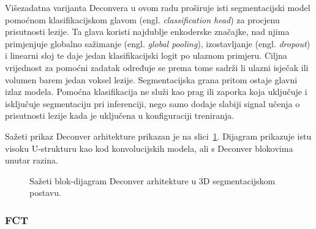 \documentclass[a4paper,12pt,oneside]{article}
\begin{document}
Višezadatna varijanta Deconvera u ovom radu proširuje isti segmentacijski model pomoćnom klasifikacijskom glavom (engl. \textit{classification head}) za procjenu prisutnosti lezije. Ta glava koristi najdublje enkoderske značajke, nad njima primjenjuje globalno sažimanje (engl. \textit{global pooling}), izostavljanje (engl. \textit{dropout}) i linearni sloj te daje jedan klasifikacijski logit po ulaznom primjeru. Ciljna vrijednost za pomoćni zadatak određuje se prema tome sadrži li ulazni isječak ili volumen barem jedan voksel lezije. Segmentacijska grana pritom ostaje glavni izlaz modela. Pomoćna klasifikacija ne služi kao prag ili zaporka koja uključuje i isključuje segmentaciju pri inferenciji, nego samo dodaje slabiji signal učenja o prisutnosti lezije kada je uključena u konfiguraciji treniranja.

Sažeti prikaz Deconver arhitekture prikazan je na slici~\ref{fig:deconver_arch}. Dijagram prikazuje istu visoku U-strukturu kao kod konvolucijskih modela, ali s Deconver blokovima unutar razina.

\begin{figure}[H]
\centering
{}
\caption{Sažeti blok-dijagram Deconver arhitekture u 3D segmentacijskom postavu. \label{fig:deconver_arch}}
\end{figure}

\subsubsection{FCT}
\end{document}
